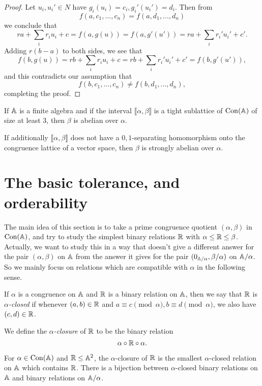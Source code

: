 \begin{appendices}
\begin{proof}
Let $u_i, u_i' \in N$ have $g_i(u_i) = c_i, g_i'(u_i') = d_i$. Then from
\[
f(a, c_1, ..., c_n) = f(a, d_1, ..., d_n)
\]
we conclude that
\[
ra + \sum_i r_iu_i + c = f(a, g(u)) = f(a, g'(u')) = ra + \sum_i r_i'u_i' + c'.
\]
Adding $r(b-a)$ to both sides, we see that
\[
f(b, g(u)) = rb + \sum_i r_iu_i + c = rb + \sum_i r_i'u_i' + c' = f(b, g'(u')),
\]
and this contradicts our assumption that
\[
f(b, c_1, ..., c_n) \ne f(b, d_1, ..., d_n),
\]
completing the proof.
\end{proof}

\begin{cor} If $\mathbb{A}$ is a finite algebra and if the interval $\llbracket \alpha, \beta \rrbracket$ is a tight sublattice of $\operatorname{Con}(\mathbb{A})$ of size at least $3$, then $\beta$ is abelian over $\alpha$.

If additionally $\llbracket \alpha, \beta \rrbracket$ does not have a $0,1$-separating homomorphism onto the congruence lattice of a vector space, then $\beta$ is strongly abelian over $\alpha$.
\end{cor}


\section{The basic tolerance, and orderability}

The main idea of this section is to take a prime congruence quotient $(\alpha, \beta)$ in $\operatorname{Con}(\mathbb{A})$, and try to study the simplest binary relations $\mathbb{R}$ with $\alpha \le \mathbb{R} \le \beta$. Actually, we want to study this in a way that doesn't give a different answer for the pair $(\alpha, \beta)$ on $\mathbb{A}$ from the answer it gives for the pair $(0_{\mathbb{A}/\alpha}, \beta/\alpha)$ on $\mathbb{A}/\alpha$. So we mainly focus on relations which are compatible with $\alpha$ in the following sense.

\begin{defn} If $\alpha$ is a congruence on $\mathbb{A}$ and $\mathbb{R}$ is a binary relation on $\mathbb{A}$, then we say that $\mathbb{R}$ is \emph{$\alpha$-closed} if whenever $(a,b) \in \mathbb{R}$ and $a \equiv c \pmod{\alpha}, b \equiv d \pmod{\alpha}$, we also have $(c,d) \in \mathbb{R}$.

We define the \emph{$\alpha$-closure} of $\mathbb{R}$ to be the binary relation
\[
\alpha \circ \mathbb{R} \circ \alpha.
\]
\end{defn}

\begin{prop} For $\alpha \in \operatorname{Con}(\mathbb{A})$ and $\mathbb{R} \le \mathbb{A}^2$, the $\alpha$-closure of $\mathbb{R}$ is the smallest $\alpha$-closed relation on $\mathbb{A}$ which contains $\mathbb{R}$. There is a bijection between $\alpha$-closed binary relations on $\mathbb{A}$ and binary relations on $\mathbb{A}/\alpha$.
\end{prop}


\end{appendices}
